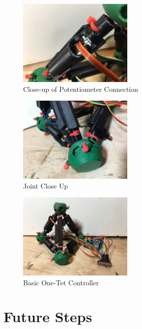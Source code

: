 \documentclass[11pt]{article}
\begin{document}
\begin{figure}[H]
  \centering
    \includegraphics[width=0.5\textwidth]{figures/PotConnectionCloseUp.JPG}
    \caption[Close-up of Potentiometer Connection]{Close-up of Potentiometer Connection}
      \label{fig:potcloseup}
\end{figure}

\begin{figure}[H]
  \centering
    \includegraphics[width=0.5\textwidth]{figures/JointCloseUp.JPG}
    \caption[Joint Close Up]{Joint Close Up}
      \label{fig:jointcloseup}
\end{figure}

\begin{figure}[H]
  \centering
    \includegraphics[width=0.5\textwidth]{figures/BasicOneTet.JPG}
    \caption[Basice One-Tet Controller]{Basic One-Tet Controller}
      \label{fig:basiconetet}
\end{figure}



\section{Future Steps}
\label{futuresteps}
\end{document}
